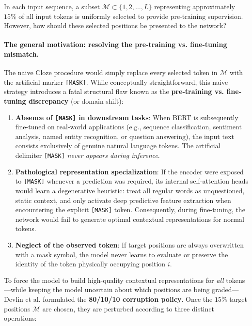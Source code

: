 \documentclass[../../main.tex]{subfiles}
\begin{document}
In each input sequence, a subset $\mathcal{M} \subset \{1, 2, \dots, L\}$ representing approximately $15\%$ of all input tokens is uniformly selected to provide pre-training supervision. However, how should these selected positions be presented to the network?

\paragraph{The general motivation: resolving the pre-training vs. fine-tuning mismatch.}
The naive Cloze procedure would simply replace every selected token in $\mathcal{M}$ with the artificial marker \texttt{[MASK]}. While conceptually straightforward, this naive strategy introduces a fatal structural flaw known as the \textbf{pre-training vs. fine-tuning discrepancy} (or domain shift):
\begin{enumerate}
    \item \textbf{Absence of \texttt{[MASK]} in downstream tasks}: When BERT is subsequently fine-tuned on real-world applications (e.g., sequence classification, sentiment analysis, named entity recognition, or question answering), the input text consists exclusively of genuine natural language tokens. The artificial delimiter \texttt{[MASK]} \emph{never appears during inference}.
    \item \textbf{Pathological representation specialization}: If the encoder were exposed to \texttt{[MASK]} whenever a prediction was required, its internal self-attention heads would learn a degenerative heuristic: treat all regular words as unquestioned, static context, and only activate deep predictive feature extraction when encountering the explicit \texttt{[MASK]} token. Consequently, during fine-tuning, the network would fail to generate optimal contextual representations for normal tokens.
    \item \textbf{Neglect of the observed token}: If target positions are always overwritten with a mask symbol, the model never learns to evaluate or preserve the identity of the token physically occupying position $i$.
\end{enumerate}

To force the model to build high-quality contextual representations for \emph{all} tokens---while keeping the model uncertain about which positions are being graded---Devlin et al. \cite{devlin2019} formulated the \textbf{80/10/10 corruption policy}. Once the $15\%$ target positions $\mathcal{M}$ are chosen, they are perturbed according to three distinct operations:
\end{document}
